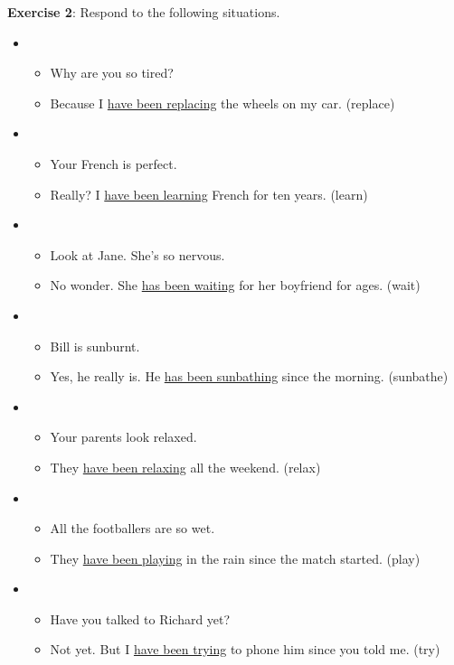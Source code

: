 \textbf{Exercise 2}: Respond to the following situations.

\begin{itemize}

\item
\begin{itemize}
\item Why are you so tired?
\item Because I \underline{have been replacing} the wheels on my car. (replace)
\end{itemize}

\item
\begin{itemize}
\item Your French is perfect.
\item Really? I \underline{have been learning} French for ten years. (learn)
\end{itemize}

\item
\begin{itemize}
\item Look at Jane. She's so nervous.
\item No wonder. She \underline{has been waiting} for her boyfriend for ages. (wait)
\end{itemize}

\item
\begin{itemize}
\item Bill is sunburnt.
\item Yes, he really is. He \underline{has been sunbathing} since the morning. (sunbathe)
\end{itemize}

\item
\begin{itemize}
\item Your parents look relaxed.
\item They \underline{have been relaxing} all the weekend. (relax)
\end{itemize}

\item
\begin{itemize}
\item All the footballers are so wet.
\item They \underline{have been playing} in the rain since the match started. (play)
\end{itemize}

\item
\begin{itemize}
\item Have you talked to Richard yet?
\item Not yet. But I \underline{have been trying} to phone him since you told me. (try)
\end{itemize}


\end{itemize}
